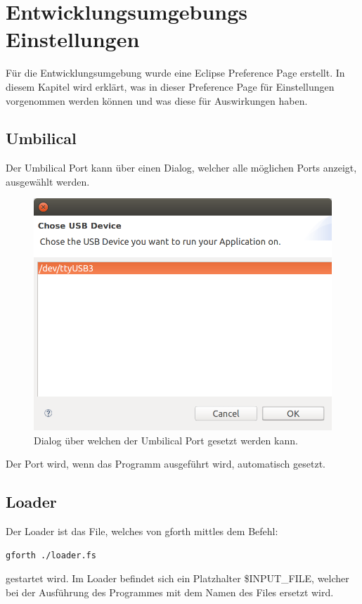 \chapter{Entwicklungsumgebungs Einstellungen}
\label{settingschapter}
Für die Entwicklungsumgebung wurde eine Eclipse Preference Page erstellt. In diesem Kapitel wird erklärt, was in dieser Preference Page für Einstellungen vorgenommen werden können und was diese für Auswirkungen haben.
\section{Umbilical}

Der Umbilical Port kann über einen Dialog, welcher alle möglichen Ports anzeigt, ausgewählt werden.

\begin{figure}[H]
	\centering
		\includegraphics[scale=0.3]{idesettings/umbilical.png}
		\caption{Dialog über welchen der Umbilical Port gesetzt werden kann.}
		\label{fig:extensionpoint}
\end{figure}

Der Port wird, wenn das Programm ausgeführt wird, automatisch gesetzt. 

\section{Loader}

Der Loader ist das File, welches von gforth mittles dem Befehl:
%
\begin{verbatim}
gforth ./loader.fs
\end{verbatim}
%
gestartet wird. Im Loader befindet sich ein Platzhalter \$INPUT\_FILE, welcher bei der Ausführung des Programmes mit dem Namen des Files ersetzt wird.